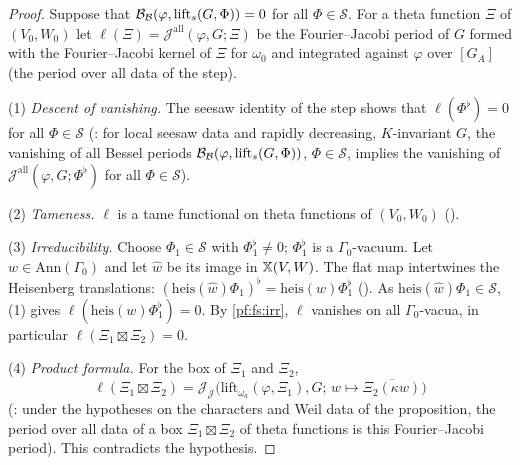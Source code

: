 \begin{proof}
Suppose that $\mathcal B_{\mathcal B}(\varphi,\mathrm{lift}_s(G,\Phi))=0$ for all $\Phi\in\mathcal S$. For a theta function $\Xi$ of $(V_0,W_0)$ let
$\ell(\Xi)=\mathcal J^{\mathrm{all}}(\varphi,G;\Xi)$ be the Fourier--Jacobi period of $G$ formed with the Fourier--Jacobi kernel of $\Xi$ for
$\omega_0$ and integrated against $\varphi$ over $[G_A]$ (the period over all data of the step).

(1) \emph{Descent of vanishing.} The seesaw identity of the step shows that $\ell(\Phi^\flat)=0$ for all $\Phi\in\mathcal S$
(: for local seesaw data and rapidly decreasing, $K$-invariant $G$, the
vanishing of all Bessel periods $\mathcal B_{\mathcal B}(\varphi,\mathrm{lift}_s(G,\Phi))$, $\Phi\in\mathcal S$, implies the vanishing of
$\mathcal J^{\mathrm{all}}(\varphi,G;\Phi^\flat)$ for all $\Phi\in\mathcal S$).

(2) \emph{Tameness.} $\ell$ is a tame functional on theta functions of $(V_0,W_0)$
().

(3) \emph{Irreducibility.} Choose $\Phi_1\in\mathcal S$ with $\Phi_1^\flat\ne0$; $\Phi_1^\flat$ is a $\Gamma_0$-vacuum. Let $w\in\mathrm{Ann}(\Gamma_0)$
and let $\hat w$ be its image in $\mathbb X(V,W)$. The flat map intertwines the Heisenberg translations: $(\mathrm{heis}(\hat w)\Phi_1)^\flat=
\mathrm{heis}(w)\Phi_1^\flat$ (). As $\mathrm{heis}(\hat w)\Phi_1\in\mathcal S$, (1) gives
$\ell(\mathrm{heis}(w)\Phi_1^\flat)=0$. By \cref{pf:fs:irr}, $\ell$ vanishes on all $\Gamma_0$-vacua, in particular $\ell(\Xi_1\boxtimes\Xi_2)=0$.

(4) \emph{Product formula.} For the box of $\Xi_1$ and $\Xi_2$,
\[
\ell(\Xi_1\boxtimes\Xi_2)=\mathcal J_{\mathcal J}\bigl(\mathrm{lift}_{\omega_a}(\varphi,\Xi_1),G;\,w\mapsto\overline{\Xi_2(\kappa w)}\bigr)
\]
(: under the hypotheses on the characters and Weil data of the
proposition, the period over all data of a box $\Xi_1\boxtimes\Xi_2$ of theta functions is this Fourier--Jacobi period). This contradicts the
hypothesis.
\end{proof}

